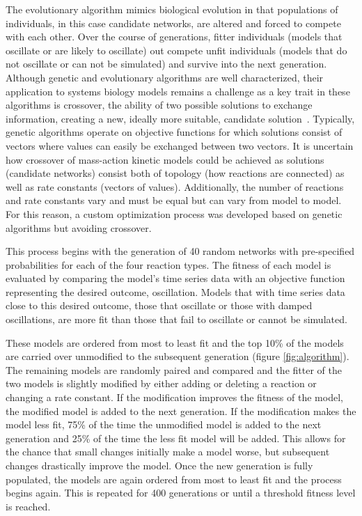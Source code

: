\documentclass[12pt]{report}
\begin{document}
The evolutionary algorithm mimics biological evolution in that populations of individuals, in this case candidate networks, are altered and forced to compete with each other. Over the course of generations, fitter individuals (models that oscillate or are likely to oscillate) out compete unfit individuals (models that do not oscillate or can not be simulated) and survive into the next generation. Although genetic and evolutionary algorithms are well characterized, their application to systems biology models remains a challenge as a key trait in these algorithms is crossover, the ability of two possible solutions to exchange information, creating a new, ideally more suitable, candidate solution~\cite{Katoch2020}. Typically, genetic algorithms operate on objective functions for which solutions consist of vectors where values can easily be exchanged between two vectors. It is uncertain how crossover of mass-action kinetic models could be achieved as solutions (candidate networks) consist both of topology (how reactions are connected) as well as rate constants (vectors of values). Additionally, the number of reactions and rate constants vary and must be equal but can vary from model to model. For this reason, a custom optimization process was developed based on genetic algorithms but avoiding crossover. 

This process begins with the generation of 40 random networks with pre-specified probabilities for each of the four reaction types.  The fitness of each model is evaluated by comparing the model's time series data with an objective function representing the desired outcome, oscillation. Models that with time series data close to this desired outcome, those that oscillate or those with damped oscillations, are more fit than those that fail to oscillate or cannot be simulated. 

These models are ordered from most to least fit and the top 10\% of the models are carried over unmodified to the subsequent generation (figure \ref{fig:algorithm}). The remaining models are randomly paired and compared and the fitter of the two models is slightly modified by either adding or deleting a reaction or changing a rate constant. If the modification improves the fitness of the model, the modified model is added to the next generation. If the modification makes the model less fit, 75\% of the time the unmodified model is added to the next generation and 25\% of the time the less fit model will be added. This allows for the chance that small changes initially make a model worse, but subsequent changes drastically improve the model. Once the new generation is fully populated, the models are again ordered from most to least fit and the process begins again. This is repeated for 400 generations or until a threshold fitness level is reached.
\end{document}
